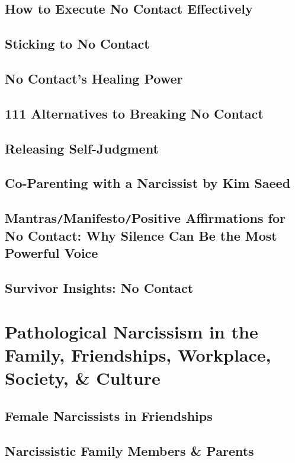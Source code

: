 \documentclass[oneside]{book}
\numberwithin{equation}{section}
\begin{document}
\subsection{How to Execute No Contact Effectively}

\subsection{Sticking to No Contact}

\subsection{No Contact's Healing Power}

\subsection{111 Alternatives to Breaking No Contact}

\subsection{Releasing Self-Judgment}

\subsection{Co-Parenting with a Narcissist by Kim Saeed}

\subsection{Mantras\texttt{/}Manifesto\texttt{/}Positive Affirmations for No Contact: Why Silence Can Be the Most Powerful Voice}

\subsection{Survivor Insights: No Contact}

\section{Pathological Narcissism in the Family, Friendships, Workplace, Society, \& Culture}

\subsection{Female Narcissists in Friendships}

\subsection{Narcissistic Family Members \& Parents}
\end{document}
